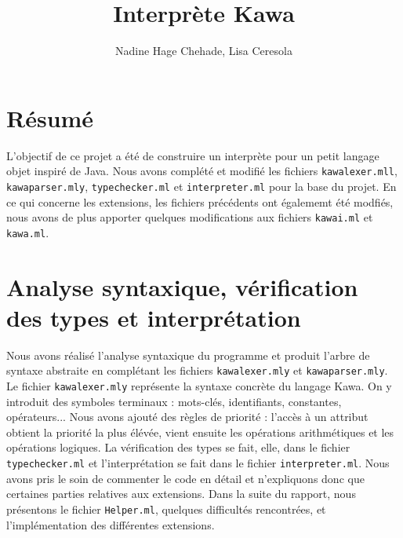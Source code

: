 \documentclass{article}
\title{{\myfont Interprète Kawa}}
\author{Nadine Hage Chehade, Lisa Ceresola}
\date{}
\begin{document}
\maketitle
\tableofcontents
\newpage
\section{Résumé}
L'objectif de ce projet a été de construire un interprète pour un petit langage objet inspiré de Java. Nous avons complété et modifié les fichiers \texttt{kawalexer.mll}, \texttt{kawaparser.mly}, \texttt{typechecker.ml} et \texttt{interpreter.ml} pour la base du projet. En ce qui concerne les extensions, les fichiers précédents ont égalememt été modfiés, nous avons de plus apporter quelques modifications aux fichiers \texttt{kawai.ml} et \texttt{kawa.ml}. \\

\section{Analyse syntaxique, vérification des types et interprétation}
Nous avons réalisé l'analyse syntaxique du programme et produit l'arbre de syntaxe abstraite en complétant les fichiers \texttt{kawalexer.mly} et \texttt{kawaparser.mly}. Le fichier \texttt{kawalexer.mly} représente la syntaxe concrète du langage Kawa. On y introduit des symboles terminaux :  mots-clés, identifiants, constantes, opérateurs... Nous avons ajouté des règles de priorité : l'accès à un attribut obtient la priorité la plus élévée, vient ensuite  les opérations arithmétiques et les opérations logiques.
La vérification des types se fait, elle, dans le fichier \texttt{typechecker.ml} et l'interprétation se fait dans le fichier \texttt{interpreter.ml}.
Nous avons pris le soin de commenter le code en détail et n'expliquons donc que certaines parties relatives aux extensions. Dans la suite du rapport, nous présentons le fichier \texttt{Helper.ml}, quelques difficultés rencontrées, et l'implémentation des différentes extensions. 
\end{document}

